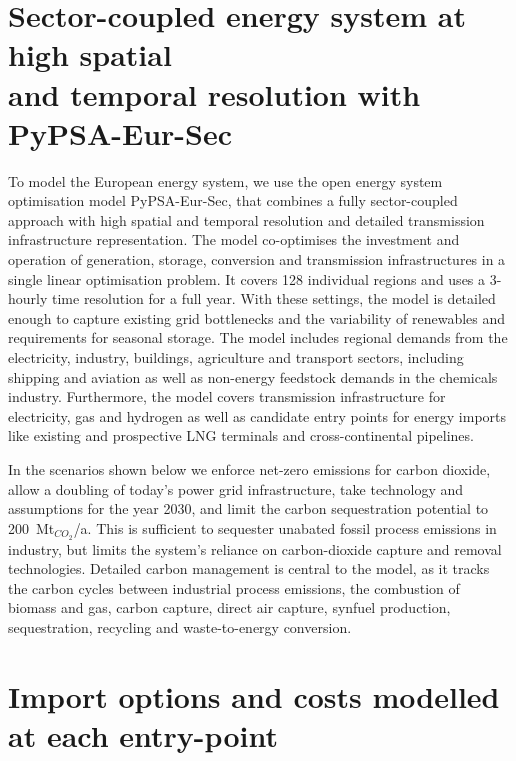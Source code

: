 \documentclass[10pt,5p,reversenotenum,lefttitle]{elsarticle}
\begin{document}
\section*{Sector-coupled energy system at high spatial\\and temporal resolution with PyPSA-Eur-Sec}

To model the European energy system, we use the open energy system
optimisation model PyPSA-Eur-Sec,\cite{PyPSAEurSecSectorCoupled} that combines a
fully sector-coupled approach with high spatial and temporal resolution and
detailed transmission infrastructure representation. The model co-optimises the
investment and operation of generation, storage, conversion and transmission
infrastructures in a single linear optimisation problem. It covers 128
individual regions and uses a 3-hourly time resolution for a full year. With
these settings, the model is detailed enough to capture existing grid
bottlenecks and the variability of renewables and requirements for seasonal
storage. The model includes regional demands from the electricity, industry,
buildings, agriculture and transport sectors, including shipping and aviation as
well as non-energy feedstock demands in the chemicals industry. Furthermore, the
model covers transmission infrastructure for electricity, gas and hydrogen as
well as candidate entry points for energy imports like existing and prospective
LNG terminals and cross-continental pipelines.

In the scenarios shown below we enforce net-zero emissions for carbon dioxide,
allow a doubling of today's power grid infrastructure, take technology and
assumptions for the year 2030\cite{dea2019}, and limit the carbon sequestration
potential to 200~Mt$_{CO_2}$/a. This is sufficient to sequester unabated fossil process
emissions in industry, but limits the system's reliance on carbon-dioxide
capture and removal technologies. Detailed carbon management is central to the model, as it
tracks the carbon cycles between industrial process emissions, the combustion of
biomass and gas, carbon capture, direct air capture, synfuel production,
sequestration, recycling and waste-to-energy conversion.

\section*{Import options and costs modelled at each entry-point}
\end{document}
